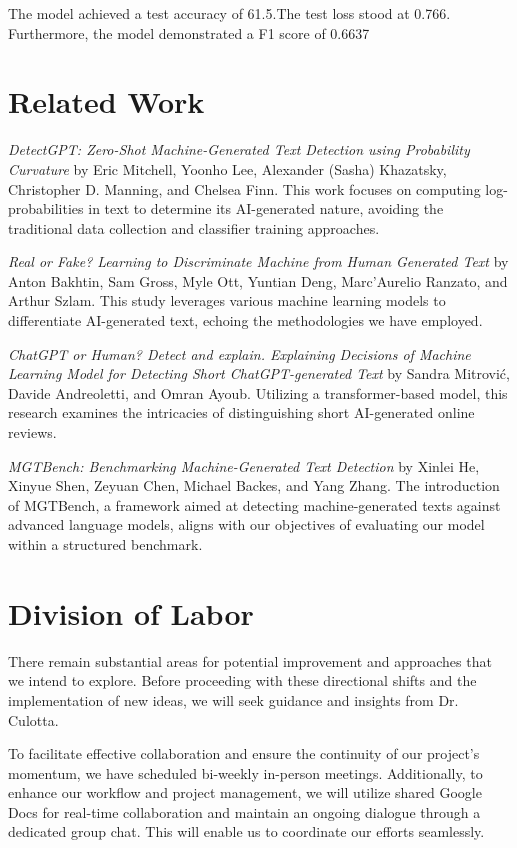 \documentclass[11pt,a4paper]{article}
\begin{document}
The model achieved a test accuracy of 61.5.The test loss stood at 0.766. Furthermore, the model demonstrated a F1 score of 0.6637 

\section{Related Work}

\textit{DetectGPT: Zero-Shot Machine-Generated Text Detection using Probability Curvature} by Eric Mitchell, Yoonho Lee, Alexander (Sasha) Khazatsky, Christopher D. Manning, and Chelsea Finn. This work focuses on computing log-probabilities in text to determine its AI-generated nature, avoiding the traditional data collection and classifier training approaches.

\textit{Real or Fake? Learning to Discriminate Machine from Human Generated Text} by Anton Bakhtin, Sam Gross, Myle Ott, Yuntian Deng, Marc'Aurelio Ranzato, and Arthur Szlam. This study leverages various machine learning models to differentiate AI-generated text, echoing the methodologies we have employed.

\textit{ChatGPT or Human? Detect and explain. Explaining Decisions of Machine Learning Model for Detecting Short ChatGPT-generated Text} by Sandra Mitrović, Davide Andreoletti, and Omran Ayoub. Utilizing a transformer-based model, this research examines the intricacies of distinguishing short AI-generated online reviews.

\textit{MGTBench: Benchmarking Machine-Generated Text Detection} by Xinlei He, Xinyue Shen, Zeyuan Chen, Michael Backes, and Yang Zhang. The introduction of MGTBench, a framework aimed at detecting machine-generated texts against advanced language models, aligns with our objectives of evaluating our model within a structured benchmark.


\section{Division of Labor}
There remain substantial areas for potential improvement and approaches that we intend to explore. Before proceeding with these directional shifts and the implementation of new ideas, we will seek guidance and insights from Dr. Culotta. 

To facilitate effective collaboration and ensure the continuity of our project's momentum, we have scheduled bi-weekly in-person meetings. Additionally, to enhance our workflow and project management, we will utilize shared Google Docs for real-time collaboration and maintain an ongoing dialogue through a dedicated group chat. This will enable us to coordinate our efforts seamlessly. 
\end{document}
